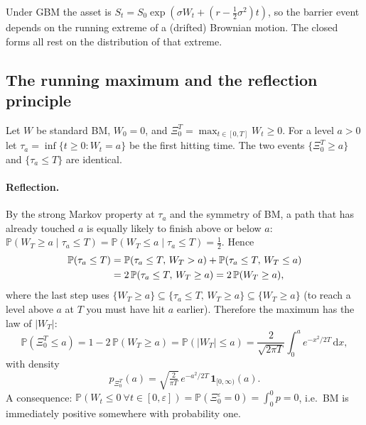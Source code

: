 \documentclass[11pt]{article}
\newcommand{\Prob}{\mathbb{P}}
\newcommand{\dd}{\,\mathrm{d}}
\newcommand{\Max}{\Xi}
\begin{document}
Under GBM the asset is $S_t=S_0\exp(\sigma W_t+(r-\tfrac12\sigma^2)t)$, so the barrier event depends on the
running extreme of a (drifted) Brownian motion. The closed forms all rest on the distribution of that extreme.

\subsection{The running maximum and the reflection principle}\label{sec:reflection}
Let $W$ be standard BM, $W_0=0$, and $\Max_0^T=\max_{t\in[0,T]}W_t\ge 0$. For a level $a>0$ let
$\tau_a=\inf\{t\ge0:W_t=a\}$ be the first hitting time. The two events $\{\Max_0^T\ge a\}$ and
$\{\tau_a\le T\}$ are identical.

\paragraph{Reflection.} By the strong Markov property at $\tau_a$ and the symmetry of BM, a path that has
already touched $a$ is equally likely to finish above or below $a$:
$\Prob(W_T\ge a\mid\tau_a\le T)=\Prob(W_T\le a\mid\tau_a\le T)=\tfrac12$. Hence
\begin{align}
\Prob(\tau_a\le T)
&=\Prob(\tau_a\le T,\,W_T>a)+\Prob(\tau_a\le T,\,W_T\le a)\notag\\
&=2\,\Prob(\tau_a\le T,\,W_T\ge a)
 =2\,\Prob(W_T\ge a),\label{eq:refl}
\end{align}
where the last step uses $\{W_T\ge a\}\subseteq\{\tau_a\le T,\,W_T\ge a\}\subseteq\{W_T\ge a\}$ (to reach a
level above $a$ at $T$ you must have hit $a$ earlier). Therefore the maximum has the law of $|W_T|$:
\begin{equation}\label{eq:maxcdf}
\Prob(\Max_0^T\le a)=1-2\,\Prob(W_T\ge a)=\Prob(|W_T|\le a)
=\frac{2}{\sqrt{2\pi T}}\int_0^a e^{-x^2/2T}\dd x,
\end{equation}
with density
\begin{equation}\label{eq:maxdensity}
\boxed{\;p_{\Max_0^T}(a)=\sqrt{\tfrac{2}{\pi T}}\,e^{-a^2/2T}\,\mathbf 1_{[0,\infty)}(a).\;}
\end{equation}
A consequence: $\Prob(W_t\le0\ \forall t\in[0,\varepsilon])=\Prob(\Max_0^\varepsilon=0)=\int_0^0 p=0$, i.e.\
BM is immediately positive somewhere with probability one.
\end{document}
